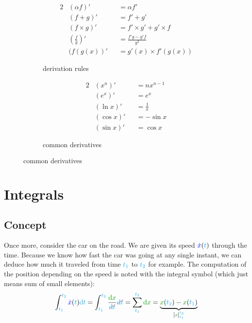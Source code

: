 \begin{figure}[H]
\begin{subfigure}{0.5\textwidth}
\begin{alignat*}{2}
& (\alpha f)'              &&= \alpha f' \\
& (f + g)'                 &&= f' + g' \\
& (f \times g)'            &&= f' \times g' + g' \times f \\
& \left(\frac f g\right)'  &&= \frac {f'g - g'f} {g^2} \\
& (f(g(x))'                &&= g'(x) \times f'(g(x))
\end{alignat*}
\caption{derivation rules}
\end{subfigure}
\begin{subfigure}{0.5\textwidth}
\begin{alignat*}{2}
& (x^n)'    &&= n x^{n-1}   \\
& (e^x)'    &&= e^x         \\
& (\ln x)'  &&= \frac 1 x \\
& (\cos x)' &&= -\sin x \\
& (\sin x)' &&=  \cos x
\end{alignat*}
\caption{common derivatives}
\end{subfigure}
\end{figure}



\section{Integrals}


\subsection{Concept}

Once more, consider the car on the road. We are given its speed
$\textcolor{blue}{\dot x}(\textcolor{cyan}{t})$ through the time. Because we know how fast the
car was going at any single instant, we can deduce how much it traveled
from time $\textcolor{cyan}{t_1}$ to $\textcolor{cyan}{t_2}$ for example. The computation
of the position depending on the speed is
noted with the integral symbol (which just means sum of small elements):
\[
\int_{\delay{t_1}}^{\delay{t_2}} \speed{\dot x}(\delay{t}) \delay{\dt}
= \int_{\delay{t_1}}^{\delay{t_2}} \frac {\dist{\d x}} {\strike[red]{\delay{\dt}}} \strike[red]{\delay{\dt}}
= \sum_{\delay{t_1}}^{\delay{t_2}} \dist{\d x}
= \underbrace{
	\dist{x}(\delay{t_2}) - \dist{x}(\delay{t_1})
}_{[\dist{x}]_{\delay{t_1}}^{\delay{t_2}}}
\]


